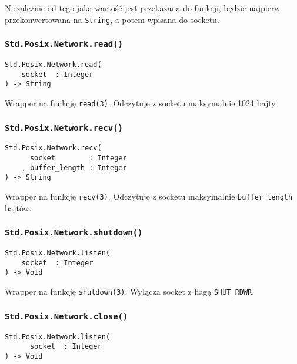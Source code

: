 Niezależnie od tego jaka wartość jest przekazana do funkcji, będzie najpierw przekonwertowana na
\texttt{String}, a potem wpisana do socketu.

\subsubsection{\texttt{Std.Posix.Network.read()}}

\begin{small}
\begin{lstlisting}
Std.Posix.Network.read(
    socket  : Integer
) -> String
\end{lstlisting}
\end{small}

Wrapper na funkcję \texttt{read(3)}. Odczytuje z socketu maksymalnie 1024 bajty.

\subsubsection{\texttt{Std.Posix.Network.recv()}}

\begin{small}
\begin{lstlisting}
Std.Posix.Network.recv(
      socket        : Integer
    , buffer_length : Integer
) -> String
\end{lstlisting}
\end{small}

Wrapper na funkcję \texttt{recv(3)}. Odczytuje z socketu maksymalnie \texttt{buffer\_length} bajtów.

\subsubsection{\texttt{Std.Posix.Network.shutdown()}}

\begin{small}
\begin{lstlisting}
Std.Posix.Network.listen(
    socket  : Integer
) -> Void
\end{lstlisting}
\end{small}

Wrapper na funkcję \texttt{shutdown(3)}.
Wyłącza socket z flagą \texttt{SHUT\_RDWR}.

\subsubsection{\texttt{Std.Posix.Network.close()}}

\begin{small}
\begin{lstlisting}
Std.Posix.Network.listen(
      socket  : Integer
) -> Void
\end{lstlisting}
\end{small}

